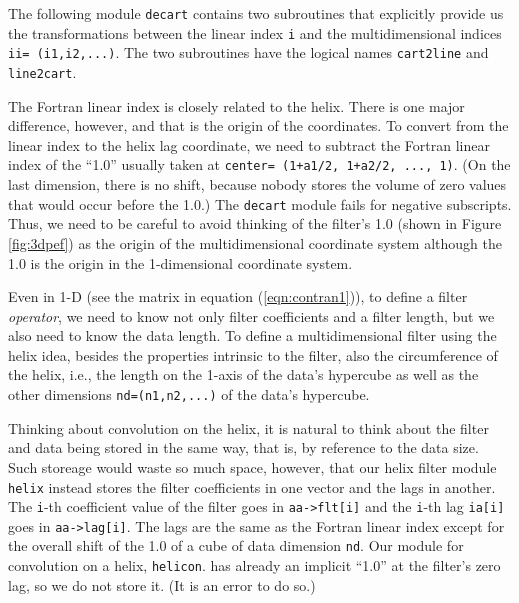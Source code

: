 \par
The following module \texttt{decart} contains
two subroutines that
explicitly provide us the transformations
between the linear index
\texttt{i}
and the multidimensional indices
\texttt{ii= (i1,i2,...)}.
The two subroutines have the logical names
\texttt{cart2line} and
\texttt{line2cart}.

\par
The Fortran linear index is closely related to the helix.
There is one major difference, however,
and that is the origin of the coordinates.
To convert from the linear index
to the helix lag coordinate,
we need to subtract the Fortran linear index of the ``1.0''
usually taken at
\texttt{center= (1+a1/2, 1+a2/2, ..., 1)}.
(On the last dimension, there is no shift, because nobody stores the
volume of zero values that would occur before the 1.0.)
The \texttt{decart} module fails for negative subscripts.
Thus, we need to be careful to avoid thinking of the filter's 1.0 
(shown in Figure \ref{fig:3dpef})
as the origin of the multidimensional coordinate system
although the 1.0 is the origin in the 1-dimensional coordinate system.

\par
Even in 1-D
(see the matrix in equation (\ref{eqn:contran1})),
to define a filter {\it operator}, we need to know
not only filter coefficients and a filter length,
but we also need to know the data length.
To define a multidimensional filter using the helix idea,
besides the properties intrinsic to the filter,
also the circumference of the helix,
i.e., the length on the 1-axis of the data's hypercube
as well as the other dimensions
\texttt{nd=(n1,n2,...)}
of the data's hypercube.

\par
Thinking about convolution on the helix,
it is natural to think about the filter and data being stored
in the same way, that is, by reference to the data size.
Such storeage would waste so much space, however,
that our helix filter module
\texttt{helix} 
instead stores the filter coefficients in one vector
and the lags in another.
The \texttt{i}-th coefficient value
of the filter goes in  \verb#aa->flt[i]# and
the \texttt{i}-th lag \texttt{ia[i]} goes in \verb#aa->lag[i]#.
The lags are the same as the Fortran linear index
except for the overall shift of the 1.0 of a cube of 
data dimension \texttt{nd}.
Our module for convolution on a helix,
\texttt{helicon}. %
has already an implicit
``1.0'' at the filter's zero lag, so we do not store it.
(It is an error to do so.)

